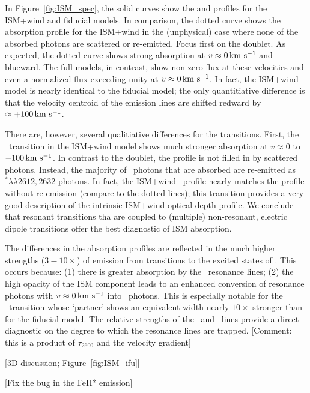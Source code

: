 \documentclass[12pt,preprint]{aastex}
\begin{document}
In Figure~\ref{fig:ISM_spec}, the solid curves show the  and
 profiles for the ISM+wind and fiducial 
models. In comparison, the
dotted curve shows the absorption profile for the ISM+wind in the (unphysical) case
where none of the absorbed photons are scattered or re-emitted.   Focus first on the
 doublet.  As expected, the dotted curve shows strong
absorption at $v \approx 0 \, {\rm km~s^{-1}}$ and blueward.  The full models,
in contrast, show non-zero flux at these velocities and even a
normalized flux exceeding unity at $v \approx 0 \, {\rm km~s^{-1}}$.  In
fact, the ISM+wind model is nearly identical to the fiducial model;
the only quantitiative difference is that the velocity centroid of
the emission lines are shifted redward by $\approx +100 \, {\rm km~s^{-1}}$.

There are, however, several qualitiative differences 
for the  transitions. 
First, the \feiia\ transition in the ISM+wind model
shows much stronger absorption at $v \approx 0$
to $-100 \, {\rm km~s^{-1}}$.  In contrast to the  doublet,
the profile is not filled in by scattered photons. Instead, 
the majority of \feiia\ photons that are absorbed are re-emitted as
~$^* \lambda\lambda 2612, 2632$ photons.  In fact, the
ISM+wind \feiia\ profile nearly matches the profile without re-emission 
(compare to the dotted lines); this transition provides a
very good description of the intrinsic ISM+wind optical depth profile.  
We conclude that resonant transitions tha are coupled to (multiple)
non-resonant, electric dipole transitions offer the best
diagnostic of ISM absorption.

The differences in the  absorption profiles are reflected
in the much higher strengths ($3-10\times$) of emission from
transitions to the excited states of \aconfig.   This occurs because:
(1) there is greater absorption by the \feiid\
resonance lines; (2) the high opacity of the ISM component leads to
an enhanced conversion of resonance photons with $v \approx 0\, {\rm km~s^{-1}}$
into \feiis\ photons.  This is especially notable for the
\feiib\ transition whose `partner' shows an equivalent width nearly
$10\times$ stronger than for the fiducial model.  The relative
strengths of the \feiib\ and \feiie\ lines provide a direct
diagnostic on the degree to which the resonance lines are trapped.
[Comment:  this is a product of $\tau_{2600}$ and the velocity
gradient]

[3D discussion; Figure~\ref{fig:ISM_ifu}]

[Fix the bug in the FeII* emission]
\end{document}

